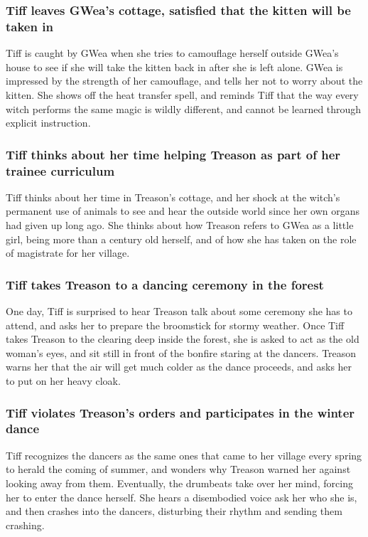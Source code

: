 \subsubsection{\Gls{Tiff} leaves \Gls{GWea}'s cottage, satisfied that the kitten will be taken in}
\Gls{Tiff} is caught by \Gls{GWea} when she tries to camouflage herself outside \Gls{GWea}'s house
to see if she will take the kitten back in after she is left alone. \Gls{GWea} is impressed by the
strength of her camouflage, and tells her not to worry about the kitten. She shows off the heat
transfer spell, and reminds \Gls{Tiff} that the way every witch performs the same magic is wildly
different, and cannot be learned through explicit instruction.

\subsubsection{\Gls{Tiff} thinks about her time helping \Gls{Treason} as part of her trainee
    curriculum}
\Gls{Tiff} thinks about her time in \Gls{Treason}'s cottage, and her shock at the witch's permanent
use of animals to see and hear the outside world since her own organs had given up long ago. She
thinks about how \Gls{Treason} refers to \Gls{GWea} as a little girl, being more than a century old
herself, and of how she has taken on the role of magistrate for her village.

\subsubsection{\Gls{Tiff} takes \Gls{Treason} to a dancing ceremony in the forest}
One day, \Gls{Tiff} is surprised to hear \Gls{Treason} talk about some ceremony she has to attend,
and asks her to prepare the broomstick for stormy weather. Once \Gls{Tiff} takes \Gls{Treason} to
the clearing deep inside the forest, she is asked to act as the old woman's eyes, and sit still in
front of the bonfire staring at the dancers. \Gls{Treason} warns her that the air will get much
colder as the dance proceeds, and asks her to put on her heavy cloak.

\subsubsection{\Gls{Tiff} violates \Gls{Treason}'s orders and participates in the winter dance}
\Gls{Tiff} recognizes the dancers as the same ones that came to her village every spring to herald
the coming of summer, and wonders why \Gls{Treason} warned her against looking away from them.
Eventually, the drumbeats take over her mind, forcing her to enter the dance herself. She hears a
disembodied voice ask her who she is, and then crashes into the dancers, disturbing their rhythm and
sending them crashing.


